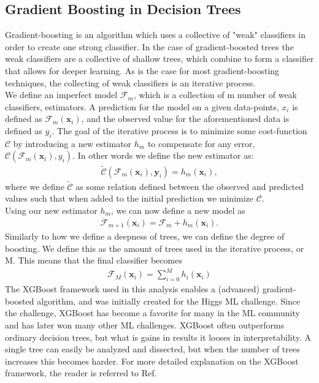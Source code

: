 \subsection{Gradient Boosting in Decision Trees}
Gradient-boosting is an algorithm which uses a collective of "weak" 
classifiers in order to create one strong classifier. In the case of gradient-boosted 
trees the weak classifiers are a collective of shallow trees, which combine to form a classifier 
that allows for deeper learning. As is the case for most gradient-boosting 
techniques, the collecting of weak classifiers is an iterative process.
\\
We define an imperfect model $\mathcal{F}_m$, which is a collection of m number of weak 
classifiers, estimators. A prediction for the model on a given data-points, $x_i$ is 
defined as $\mathcal{F}_m(\textbf{x}_i)$, and the observed value for the aforementioned data is 
defined as $y_i$. The goal of the iterative process is to minimize some cost-function 
$\mathcal{C}$ by introducing a new estimator $h_m$ to compensate for any error, 
$\mathcal{C}(\mathcal{F}_m(\textbf{x}_i), y_i)$. In other words we define the new estimator as:
\begin{align}
    \tilde{\mathcal{C}}(\mathcal{F}_m(\textbf{x}_i), \textbf{y}_i) = h_m(\textbf{x}_i),
\end{align}
where we define $\tilde{\mathcal{C}}$ as some relation defined between the observed and 
predicted values such that when added to the initial prediction we minimize $\mathcal{C}$.
\\
Using our new estimator $h_m$, we can now define a new model as
\begin{align}
    \mathcal{F}_{m+1}(\textbf{x}_i) = \mathcal{F}_m + h_m (\textbf{x}_i).
\end{align}
Similarly to how we define a deepness of trees, we can define the degree of boosting. We define 
this as the amount of trees used in the iterative process, or M. This means that the final classifier 
becomes
\begin{align}
    \mathcal{F}_M (\textbf{x}_i) = \sum_{i=0}^M h_i(\textbf{x}_i)
\end{align} 
The XGBoost \cite{XGB} framework used in this analysis enables a (advanced) gradient-boosted algorithm, 
and was initially created for the Higgs ML challenge. Since the challenge, XGBoost has become 
a favorite for many in the ML community and has later won many other ML challenges. XGBoost 
often outperforms ordinary decision trees, but what is gains in results it looses in 
interpretability. A single tree can easily be analyzed and dissected, but when the number 
of trees increases this becomes harder. For more detailed explanation on the XGBoost framework,
the reader is referred to Ref.\cite{Chen_2016}